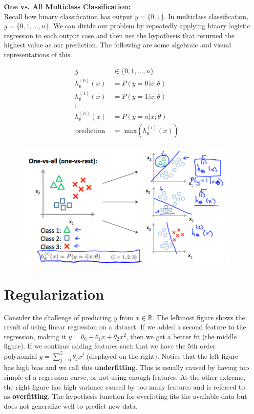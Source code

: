 \noindent \textbf{One vs. All Multiclass Classification:} \\
Recall how binary classification has output $y=\{0,1\}$. In multiclass classification, $y=\{0,1,\dots,n\}$.
We can divide our problem by repeatedly applying binary logistic regression to each output case and
then use the hypothesis that returned the highest value as our prediction. The following are some
algebraic and visual representations of this.

\begin{align*}
    y                   & \in\{0,1,\dots,n\} \\
    h_{\theta}^{(0)}(x) &= P(y=0|x;\theta) \\
    h_{\theta}^{(1)}(x) &= P(y=1|x;\theta) \\
    \vdots \\
    h_{\theta}^{(n)}(x) &= P(y=n|x;\theta) \\
    \text{prediction }  &= \text{ max}(h_{\theta}^{(i)}(x))
\end{align*}

\begin{figure}[hbt!]
    \centering
    \includegraphics[scale=0.9]{Resources/Multiclass_Classification}
\end{figure}



\pagebreak
\section{Regularization}
Consider the challenge of predicting $y$ from $x\in\mathbb{R}$. The leftmost figure shows the result
of using linear regression on a dataset. If we added a second feature to the regression, making it
$y=\theta_0+\theta_1 x+\theta_2 x^2$, then we get a better fit (the middle figure). If we continue
adding features such that we have the 5th order polynomial $y=\sum^5_{j=0}\theta_j x^j$ (displayed
on the right). Notice that the left figure has high bias and we call this \textbf{underfitting}.
This is usually caused by having too simple of a regression curve, or not using enough features.
At the other extreme, the right figure has high variance caused by too many features and is referred
to as \textbf{overfitting}. The hypothesis function for overfitting fits the available data but
does not generalize well to predict new data. \\

